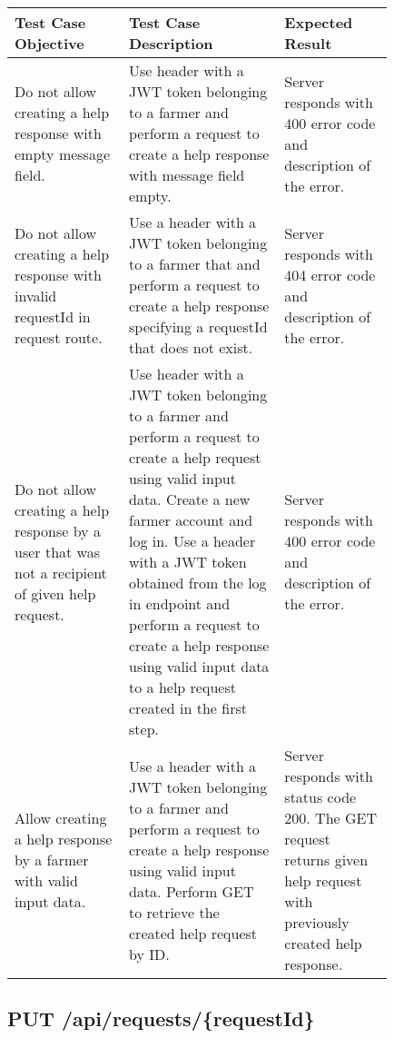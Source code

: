 \begin{longtable}{p{0.25\linewidth}p{0.34\linewidth}p{0.24\linewidth}}
	\toprule
	\textbf{Test Case Objective} & \textbf{Test Case Description} & \textbf{Expected Result}\\
	\midrule
	Do not allow creating a help response with empty message field. & Use header with a JWT token belonging to a farmer and perform a request to create a help response with message field empty. & Server responds with 400 error code and description of the error.\\
	\midrule
	Do not allow creating a help response with invalid requestId in request route. & Use a header with a JWT token belonging to a farmer that and perform a request to create a help response specifying a requestId that does not exist. &  Server responds with 404 error code and description of the error.\\
	\midrule
	Do not allow creating a help response by a user that was not a recipient of given help request. & Use header with a JWT token belonging to a farmer and perform a request to create a help request using valid input data. Create a new farmer account and log in. Use a header with a JWT token obtained from the log in endpoint and perform a request to create a help response using valid input data to a help request created in the first step. & Server responds with 400 error code and description of the error.\\
	\midrule
	Allow creating a help response by a farmer with valid input data. & Use a header with a JWT token belonging to a farmer and perform a request to create a help response using valid input data. Perform GET to retrieve the created help request by ID. & Server responds with status code 200. The GET request returns given help request with previously created help response.\\

	\bottomrule
\end{longtable}


\subsection{PUT \slash api\slash requests\slash \{requestId\}}

